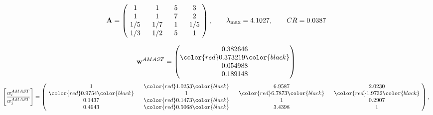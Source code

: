 \begin{example}
\begin{equation*}
\mathbf{A} =
\begin{pmatrix}
$\,\,$ 1 $\,\,$ & $\,\,$1$\,\,$ & $\,\,$5$\,\,$ & $\,\,$3 $\,\,$ \\
$\,\,$ 1 $\,\,$ & $\,\,$ 1 $\,\,$ & $\,\,$7$\,\,$ & $\,\,$2 $\,\,$ \\
$\,\,$ 1/5$\,\,$ & $\,\,$ 1/7$\,\,$ & $\,\,$ 1 $\,\,$ & $\,\,$ 1/5 $\,\,$ \\
$\,\,$ 1/3$\,\,$ & $\,\,$ 1/2$\,\,$ & $\,\,$5$\,\,$ & $\,\,$ 1  $\,\,$ \\
\end{pmatrix},
\qquad
\lambda_{\max} =
4.1027,
\qquad
CR = 0.0387
\end{equation*}

\begin{equation*}
\mathbf{w}^{AMAST} =
\begin{pmatrix}
0.382646\\
\color{red} 0.373219\color{black} \\
0.054988\\
0.189148
\end{pmatrix}\end{equation*}
\begin{equation*}
\left[ \frac{{w}^{AMAST}_i}{{w}^{AMAST}_j} \right] =
\begin{pmatrix}
$\,\,$ 1 $\,\,$ & $\,\,$\color{red} 1.0253\color{black} $\,\,$ & $\,\,$6.9587$\,\,$ & $\,\,$2.0230$\,\,$ \\
$\,\,$\color{red} 0.9754\color{black} $\,\,$ & $\,\,$ 1 $\,\,$ & $\,\,$\color{red} 6.7873\color{black} $\,\,$ & $\,\,$\color{red} 1.9732\color{black}   $\,\,$ \\
$\,\,$0.1437$\,\,$ & $\,\,$\color{red} 0.1473\color{black} $\,\,$ & $\,\,$ 1 $\,\,$ & $\,\,$0.2907 $\,\,$ \\
$\,\,$0.4943$\,\,$ & $\,\,$\color{red} 0.5068\color{black} $\,\,$ & $\,\,$3.4398$\,\,$ & $\,\,$ 1  $\,\,$ \\
\end{pmatrix},
\end{equation*}


\end{example}

